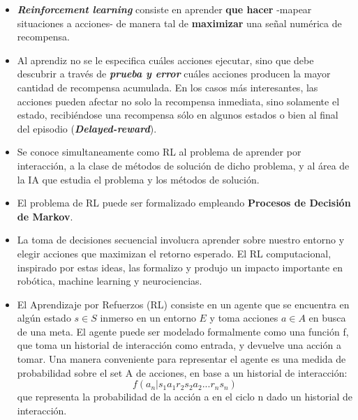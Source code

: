\documentclass[11pt]{article}
\begin{document}
\begin{itemize}
\item
  \textbf{\emph{Reinforcement learning}} consiste en aprender
  \textbf{que hacer} -mapear situaciones a acciones- de manera tal de
  \textbf{maximizar} una señal numérica de recompensa.
\item
  Al aprendiz no se le especifica cuáles acciones ejecutar, sino que
  debe descubrir a través de \textbf{\emph{prueba y error}} cuáles
  acciones producen la mayor cantidad de recompensa acumulada. En los
  casos más interesantes, las acciones pueden afectar no solo la
  recompensa inmediata, sino solamente el estado, recibiéndose una
  recompensa sólo en algunos estados o bien al final del episodio
  (\textbf{\emph{Delayed-reward}}).
\item
  Se conoce simultaneamente como RL al problema de aprender por
  interacción, a la clase de métodos de solución de dicho problema, y al
  área de la IA que estudia el problema y los métodos de solución.
\item
  El problema de RL puede ser formalizado empleando \textbf{Procesos de
  Decisión de Markov}.
\item
  La toma de decisiones secuencial involucra aprender sobre nuestro
  entorno y elegir acciones que maximizan el retorno esperado. El RL
  computacional, inspirado por estas ideas, las formalizo y produjo un
  impacto importante en robótica, machine learning y neurociencias.
\item
  El Aprendizaje por Refuerzos (RL) consiste en un agente que se
  encuentra en algún estado \(s \in S\) inmerso en un entorno \(E\) y
  toma acciones \(a \in A\) en busca de una meta. El agente puede ser
  modelado formalmente como una función f, que toma un historial de
  interacción como entrada, y devuelve una acción a tomar. Una manera
  conveniente para representar el agente es una medida de probabilidad
  sobre el set A de acciones, en base a un historial de interacción:
  \[ f(a_{n}|s_{1}a_{1} r_{2} s_{2}a_{2}...r_{n}s_{n}) \] que representa
  la probabilidad de la acción a en el ciclo n dado un historial de
  interacción.
\end{itemize}
\end{document}
